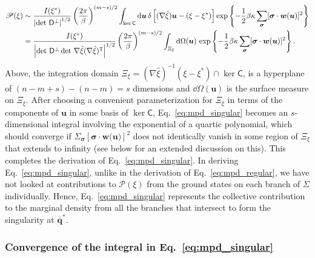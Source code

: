 \begin{equation}
  \begin{aligned}
    \mathscr{P}(\xi) &\sim \frac{I(\xi^{*})}{\left|\det\, \mathsf{D}^\perp\right|^{1/2}} \left(\frac{2\pi}{\beta}\right)^{(m-s)/2} \int_{\ker\mathsf{C}} \mathrm{d}\bm{u}\, \delta\left[(\nabla\hat{\xi})\bm{u} - (\xi - \xi^{*})\right] \exp\left\{-\frac{1}{2}\beta\kappa\sum_{\bm{\sigma}}[\bm{\sigma}\cdot \bm{w}(\bm{u})]^2\right\}\\
                                 &= \frac{I({\xi}^{*})}{\left|\det\, \mathsf{D}^\perp \det\, \nabla\hat{\xi}(\nabla\hat{\xi})^\mathsf{T}\right|^{1/2}}  \left(\frac{2\pi}{\beta}\right)^{(m-s)/2} \int_{\Xi_{\xi}} \mathrm{d}\Omega(\bm{u})\, \exp\left\{-\frac{1}{2}\beta\kappa\sum_{\bm{\sigma}}[\bm{\sigma}\cdot\bm{w}(\bm{u})]^2\right\}.
  \end{aligned}
  \label{eq:mpd_singular}
\end{equation}
%
Above, the integration domain $\Xi_{\xi} = (\nabla\hat{\xi})^{-1}(\xi - \xi^{*}) \cap \ker\mathsf{C}$, is a hyperplane of $(n - m + s) - (n - m) = s$ dimensions and $\dd\Omega(\bm{u})$ is the surface measure on $\Xi_{\xi}$.
After choosing a convenient parameterization for $\Xi_{\xi}$ in terms of the components of $\bm{u}$ in some basis of $\ker\mathsf{C}$, Eq.~\eqref{eq:mpd_singular} becomes an $s$-dimensional integral involving the exponential of a quartic polynomial, which should converge if $\Sigma_{\bm{\sigma}} [\bm{\sigma}\cdot\bm{w}(\bm{u)}]^2$ does not identically vanish in some region of $\Xi_{\xi}$ that extends to infinity (see below for an extended discussion on this).
This completes the derivation of Eq.~\eqref{eq:mpd_singular}.
In deriving Eq.~\eqref{eq:mpd_singular}, unlike in the derivation of Eq.~\eqref{eq:mpd_regular}, we have not looked at contributions to $\mathscr{P}(\xi)$ from the ground states on each branch of $\Sigma$ individually.
Hence, Eq.~\eqref{eq:mpd_singular} represents the collective contribution to the marginal density from all the branches that intersect to form the singularity at $\bar{\bm{q}}^{*}$.

\subsubsection*{Convergence of the integral in \texorpdfstring{Eq.~\eqref{eq:mpd_singular}}{Eq. (5)}}
\label{sec:convergence}

